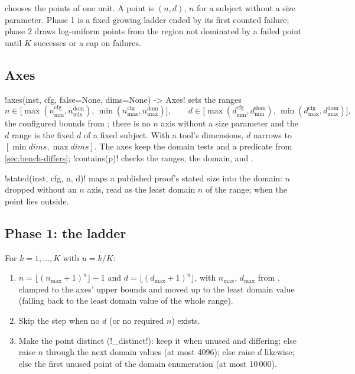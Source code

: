  chooses the points of one unit. A point is $(n, d)$, $n$ 
for a subject without a size parameter. Phase 1 is a fixed growing ladder ended by its first
counted failure; phase 2 draws log-uniform points from the region not dominated by a failed point
until $K$ successes or a cap on failures.

\subsection{Axes}

\py!axes(inst, cfg, false=None, dims=None) -> Axes! sets the ranges
\[
  n\in\bigl[\max(n^{\mathrm{cfg}}_{\min}, n^{\mathrm{dom}}_{\min}),\,
    \min(n^{\mathrm{cfg}}_{\max}, n^{\mathrm{dom}}_{\max})\bigr],\qquad
  d\in\bigl[\max(d^{\mathrm{cfg}}_{\min}, d^{\mathrm{dom}}_{\min}),\,
    \min(d^{\mathrm{cfg}}_{\max}, d^{\mathrm{dom}}_{\max})\bigr],
\]
the configured bounds from ; there is no $n$ axis without a size parameter and the
$d$ range is the fixed $d$ of a fixed subject. With a tool's dimensions, $d$ narrows to
$[\min \mathit{dims}, \max\mathit{dims}]$. The axes keep the domain tests and a 
predicate from \cref{sec:bench-differs}; \py!contains(p)! checks the ranges, the domain, and .

\py!stated(inst, cfg, n, d)! maps a published proof's stated size into the domain: $n$ dropped
without an $n$ axis,  read as the least domain $n$ of the range;  when the
point lies outside.

\subsection{Phase 1: the ladder}

\begin{algorithm}\label{alg:bench-ladder}
For $k = 1,\dots,K$ with $u = k/K$:
\begin{enumerate}
\item $n = \lfloor (n_{\max}+1)^u\rfloor - 1$ and $d=\lfloor (d_{\max}+1)^u\rfloor$, with
  $n_{\max}$, $d_{\max}$ from , clamped to the axes' upper bounds and moved up to
  the least domain value (falling back to the least domain value of the whole range).
\item Skip the step when no $d$ (or no required $n$) exists.
\item Make the point distinct (\py!_distinct!): keep it when unused and differing; else raise
  $n$ through the next domain values (at most 4096); else raise $d$ likewise; else the first
  unused point of the domain enumeration (at most 10\,000).
\end{enumerate}
\end{algorithm}

